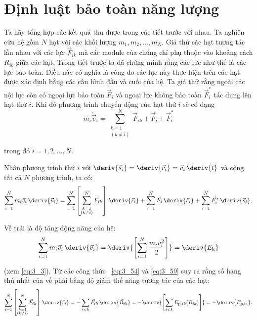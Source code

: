 
\section{Định luật bảo toàn năng lượng}\label{sec:3_7}

Ta hãy tổng hợp các kết quả thu được trong các tiết trước với nhau. Ta nghiên cứu hệ gồm $N$ hạt với các khối lượng $m_1, m_2, \ldots, m_N$. Giả thử các hạt tương tác lẫn nhau với các lực $\vec{F}_{ik}$ mà các module của chúng chỉ phụ thuộc vào khoảng cách $R_{ik}$ giữa các hạt. Trong tiết trước ta đã chứng minh rằng các lực như thế là các lực bảo toàn. Điều này có nghĩa là công do các lực này thực hiện trên các hạt được xác định bằng các cấu hình đầu và cuối của hệ. Ta giả thử rằng ngoài các nội lực còn có ngoại lực bảo toàn $\vec{F}_i$ và ngoại lực không bảo toàn $\vec{F}_i^*$ tác dụng lên hạt thứ $i$. Khi đó phương trình chuyển động của hạt thứ $i$ sẽ có dạng 
\begin{equation}\label{eq:3_66}
m_i\dot{\vec{v}}_i = \sum_{\substack{k=1\\(k\neq i)}}^{N} \vec{F}_{ik} + \vec{F}_i + \vec{F}_i^*
\end{equation}

\noindent
trong đó $i=1,2,\ldots,N$.

Nhân phương trình thứ $i$ với $\deriv{\vec{s}_i}=\deriv{\vec{r}_i}=\vec{v}_i\,\deriv{t}$ và cộng tất cả $N$ phương trình, ta có:
\begin{equation}\label{eq:3_67}
\sum_{i=1}^{N} m_i\vec{v}_i\,\deriv{\vec{v}_i} = \sum_{i=1}^{N}\left[\sum_{\substack{k=1\\(k\neq i)}}^{N} \vec{F}_{ik}\right]\,\deriv{\vec{r}_i} + \sum_{i=1}^{N}\vec{F}_i\,\deriv{\vec{s}_i} + \sum_{i=1}^{N}\vec{F}_i^*\,\deriv{\vec{s}_i}.
\end{equation}

\noindent
Vế trái là độ tăng động năng của hệ: 
\begin{equation}\label{eq:3_68}
\sum_{i=1}^{N} m_i\vec{v}_i\,\deriv{\vec{v}_i} = \deriv{\left[\sum_{i=1}^{N} \frac{m_iv_i^2}{2}\right]} = \deriv{E_{\text{k}}}
\end{equation}

\noindent
(xem \eqref{eq:3_3}). Từ các công thức ~\eqref{eq:3_54} và \eqref{eq:3_59} suy ra rằng số hạng thứ nhất của vế phải bằng độ giảm thế năng tương tác của các hạt:
\begin{equation}\label{eq:3_69}
\sum_{i=1}^{N}\left[\sum_{\substack{k=1\\(k\neq i)}}^{N} \vec{F}_{ik}\right]\,\deriv{\vec{r}_i} = - \sum_{i<k}\vec{F}_{ik}\,\deriv{\vec{R}_{ik}} = -\deriv{\left[\sum_{i<k} E_{\text{p},ik}(R_{ik})\right]} = -\deriv{E_{\text{p,ia}}}.
\end{equation}

